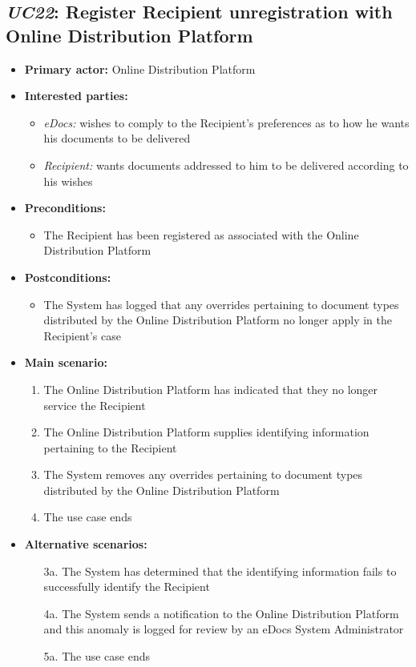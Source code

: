 \documentclass[a4paper,10pt]{article}
\begin{document}
\subsection{\emph{UC22}: Register Recipient unregistration with Online Distribution Platform}
\begin{itemize}
	\item \textbf{Primary actor:} Online Distribution Platform
	\item \textbf{Interested parties:} 
	\begin{itemize}
		\item \textit{eDocs:} wishes to comply to the Recipient's preferences as to how he wants his documents to be delivered
		\item \textit{Recipient:} wants documents addressed to him to be delivered according to his wishes
	\end{itemize}
	
	\item \textbf{Preconditions:}
	\begin{itemize}
		\item The Recipient has been registered as associated with the Online Distribution Platform
	\end{itemize}
	
	\item \textbf{Postconditions:}
	\begin{itemize}
		\item The System has logged that any overrides pertaining to document types distributed by the Online Distribution Platform no longer apply in the Recipient's case
	\end{itemize}
	
	\item \textbf{Main scenario:} 
	\begin{enumerate}
		\item The Online Distribution Platform has indicated that they no longer service the Recipient
		\item The Online Distribution Platform supplies identifying information pertaining to the Recipient
		\item The System removes any overrides pertaining to document types distributed by the Online Distribution Platform
		\item The use case ends
	\end{enumerate}
	
	\item \textbf{Alternative scenarios:} 
	\begin{enumerate}
		\item [3a.] The System has determined that the identifying information fails to successfully identify the Recipient
		\item [4a.] The System sends a notification to the Online Distribution Platform and this anomaly is logged for review by an eDocs System Administrator
		\item [5a.] The use case ends
	\end{enumerate}
	

\end{itemize}
\end{document}
